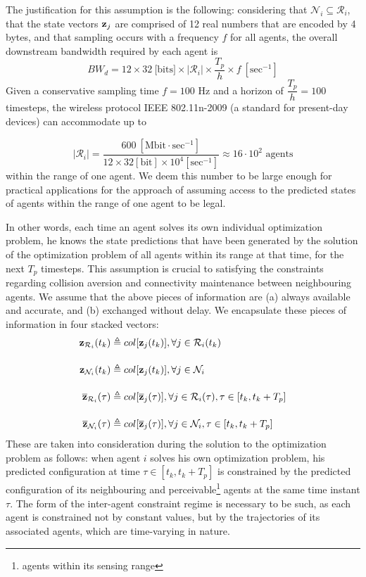 \begin{bw_box}
\begin{remark}
The justification for this assumption is the following: considering that
$\mathcal{N}_i \subseteq \mathcal{R}_i$, that the state
vectors $\bm{\mathbf{z}}_j$ are comprised of 12 real numbers that are encoded by
4 bytes, and that sampling occurs with a frequency $f$ for all agents, the
overall downstream bandwidth required by each agent is
$$BW_d = 12 \times 32\ \text{[bits]} \times |\mathcal{R}_i| \times \dfrac{T_p}{h} \times f\ [\text{sec}^{-1}]$$
Given a conservative sampling time $f = 100$ Hz and a horizon of
$\dfrac{T_p}{h} = 100$ timesteps, the wireless protocol IEEE 802.11n-2009
(a standard for present-day devices) can accommodate up to

$$|\mathcal{R}_i| = \dfrac{600\ [\text{Mbit}\cdot \text{sec}^{-1}] }{12\times32[\text{bit}]\times10^4 [\text{sec}^{-1}]} \approx
16 \cdot 10^2 \text{ agents}$$ within the range of one agent.
We deem this number to be large enough for practical applications
for the approach of assuming access to the predicted states of agents
within the range of one agent to be legal.
\end{remark}
\end{bw_box}

In other words, each time an agent solves its own individual
optimization problem, he knows the state predictions that have been generated
by the solution of the optimization problem of all agents within
its range at that time, for the next $T_p$ timesteps. This assumption is
crucial to satisfying the constraints regarding collision aversion and
connectivity maintenance between neighbouring agents.
We assume that the above pieces of information are (a) always available and
accurate, and (b) exchanged without delay. We encapsulate these pieces of
information in four stacked vectors:
\begin{subequations}
\begin{align}
  \bm{\mathbf{z}}_{\mathcal{R}_i}(t_k) &\triangleq col[\bm{\mathbf{z}}_j(t_k)], \forall j \in \mathcal{R}_i(t_k) \\[2.5ex]
  \bm{\mathbf{z}}_{\mathcal{N}_i}(t_k) &\triangleq col[\bm{\mathbf{z}}_j(t_k)], \forall j \in \mathcal{N}_i \\[2.5ex]
  \overline{\bm{\mathbf{z}}}_{\mathcal{R}_i}(\tau) &\triangleq col[\overline{\bm{\mathbf{z}}}_j(\tau)], \forall j \in \mathcal{R}_i(\tau), \tau \in [t_k, t_k + T_p] \\[2.5ex]
  \overline{\bm{\mathbf{z}}}_{\mathcal{N}_i}(\tau) &\triangleq col[\overline{\bm{\mathbf{z}}}_j(\tau)], \forall j \in \mathcal{N}_i, \tau \in [t_k, t_k + T_p]
\end{align}
\end{subequations}
These are taken into consideration during the solution to the optimization
problem as follows: when agent $i$ solves his own optimization problem,
his predicted configuration at time $\tau \in [t_k, t_k + T_p]$ is
constrained by the predicted configuration of its neighbouring and
perceivable\footnote{agents within its sensing range} agents at the same
time instant $\tau$. The form of the inter-agent constraint regime is necessary
to be such, as each agent is constrained not by constant values, but by
the trajectories of its associated agents, which are time-varying in nature.

